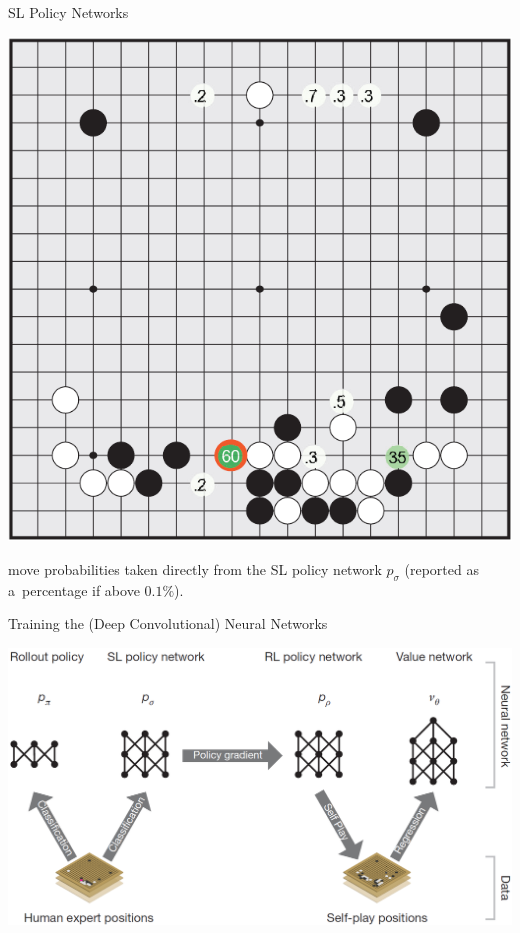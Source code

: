 \documentclass{beamer}
\begin{document}
{    \begin{frame}{SL Policy Networks}
      \begin{center}
        \includegraphics[height=.8\textheight]{../img/eval_SL_policy_network.png}

        \tiny
        move probabilities taken directly from the SL policy network $p_\sigma$ (reported as a~percentage if above $0.1\%$).
      \end{center}
    \end{frame}

    \begin{frame}{Training the (Deep Convolutional) Neural Networks}
      \begin{center}
        \includegraphics[width=\textwidth]{../img/neural_nets_pipeline.png}
      \end{center}
    \end{frame}

}
\end{document}
